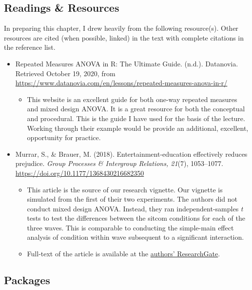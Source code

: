 \documentclass[
  11pt,
]{book}
\providecommand{\tightlist}{%
  \setlength{\itemsep}{0pt}\setlength{\parskip}{0pt}}
\begin{document}
\hypertarget{readings-resources-7}{%
\subsection{Readings \& Resources}\label{readings-resources-7}}

In preparing this chapter, I drew heavily from the following resource(s). Other resources are cited (when possible, linked) in the text with complete citations in the reference list.

\begin{itemize}
\tightlist
\item
  Repeated Measures ANOVA in R: The Ultimate Guide. (n.d.). Datanovia. Retrieved October 19, 2020, from \url{https://www.datanovia.com/en/lessons/repeated-measures-anova-in-r/}

  \begin{itemize}
  \tightlist
  \item
    This website is an excellent guide for both one-way repeated measures and mixed design ANOVA. It is a great resource for both the conceptual and procedural. This is the guide I have used for the basis of the lecture. Working through their example would be provide an additional, excellent, opportunity for practice.
  \end{itemize}
\item
  Murrar, S., \& Brauer, M. (2018). Entertainment-education effectively reduces prejudice. \emph{Group Processes \& Intergroup Relations, 21}(7), 1053--1077. \url{https://doi.org/10.1177/1368430216682350}

  \begin{itemize}
  \tightlist
  \item
    This article is the source of our research vignette. Our vignette is simulated from the first of their two experiments. The authors did not conduct mixed design ANOVA. Instead, they ran independent-samples \emph{t} tests to test the differences between the sitcom conditions for each of the three waves. This is comparable to conducting the simple-main effect analysis of condition within wave subsequent to a significant interaction.
  \item
    Full-text of the article is available at the \href{https://www.researchgate.net/publication/312177602_Entertainment-education_effectively_reduces_prejudice}{authors' ResearchGate}.
  \end{itemize}
\end{itemize}

\hypertarget{packages-6}{%
\subsection{Packages}\label{packages-6}}
\end{document}
